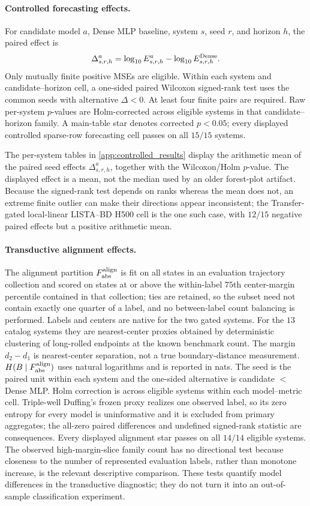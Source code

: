 \paragraph{Controlled forecasting effects.}
For candidate model \(a\), Dense MLP baseline, system \(s\), seed \(r\), and horizon \(h\), the paired effect is
\[
  \Delta_{s,r,h}^{a}
  =
  \log_{10}E^{a}_{s,r,h}
  -
  \log_{10}E^{\rm Dense}_{s,r,h}.
\]
Only mutually finite positive MSEs are eligible. Within each system and candidate--horizon cell, a one-sided paired Wilcoxon signed-rank test uses the common seeds with alternative \(\Delta<0\). At least four finite pairs are required. Raw per-system \(p\)-values are Holm-corrected across eligible systems in that candidate--horizon family. A main-table star denotes corrected \(p<0.05\); every displayed controlled sparse-row forecasting cell passes on all \(15/15\) systems.

The per-system tables in \cref{app:controlled_results} display the arithmetic mean of the paired seed effects \(\Delta_{s,r,h}^{a}\), together with the Wilcoxon/Holm \(p\)-value. The displayed effect is a mean, not the median used by an older forest-plot artifact. Because the signed-rank test depends on ranks whereas the mean does not, an extreme finite outlier can make their directions appear inconsistent; the Transfer-gated local-linear LISTA--BD H500 cell is the one such case, with \(12/15\) negative paired effects but a positive arithmetic mean.

\paragraph{Transductive alignment effects.}
The alignment partition \(F_{\rm abs}^{\rm align}\) is fit on all states in an evaluation trajectory collection and scored on states at or above the within-label \(75\)th center-margin percentile contained in that collection; ties are retained, so the subset need not contain exactly one quarter of a label, and no between-label count balancing is performed. Labels and centers are native for the two gated systems. For the \(13\) catalog systems they are nearest-center proxies obtained by deterministic clustering of long-rolled endpoints at the known benchmark count. The margin \(d_2-d_1\) is nearest-center separation, not a true boundary-distance measurement. \(H(B\mid F_{\rm abs}^{\rm align})\) uses natural logarithms and is reported in nats. The seed is the paired unit within each system and the one-sided alternative is candidate \(<\) Dense MLP. Holm correction is across eligible systems within each model--metric cell. Triple-well Duffing's frozen proxy realizes one observed label, so its zero entropy for every model is uninformative and it is excluded from primary aggregates; the all-zero paired differences and undefined signed-rank statistic are consequences. Every displayed alignment star passes on all \(14/14\) eligible systems. The observed high-margin-slice family count has no directional test because closeness to the number of represented evaluation labels, rather than monotone increase, is the relevant descriptive comparison. These tests quantify model differences in the transductive diagnostic; they do not turn it into an out-of-sample classification experiment.

